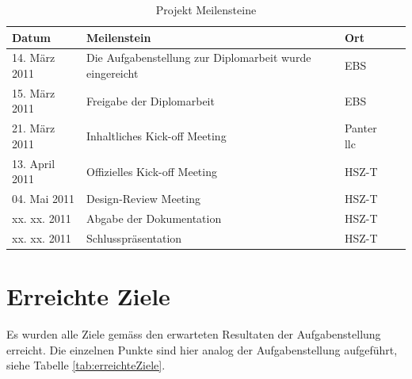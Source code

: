   \begin{table}[ht]
    \begin{center}
      \begin{tabular}{lp{7cm}ll}
        \toprule
        Datum & Meilenstein & Ort \\
        \midrule
        14. März 2011 &
        Die Aufgabenstellung zur Diplomarbeit wurde eingereicht &
        \ac{EBS}\\
        15. März 2011 &
        Freigabe der Diplomarbeit &
        \ac{EBS}\\
        21. März 2011 &
        Inhaltliches Kick-off Meeting &
        Panter llc\\
        13. April 2011 &
        Offizielles Kick-off Meeting &
        \ac{HSZ-T}\\
        04. Mai 2011 &
        Design-Review Meeting &
        \ac{HSZ-T}\\
        xx. xx. 2011 &
        Abgabe der Dokumentation &
        \ac{HSZ-T}\\
        xx. xx. 2011 &
        Schlusspräsentation &
        \ac{HSZ-T}\\
        \bottomrule
      \end{tabular}
      \caption{Projekt Meilensteine}
      \label{tab:milestones}
    \end{center}
  \end{table}
  
  \newpage
  
  \section{Erreichte Ziele}
  
  Es wurden alle Ziele gemäss den erwarteten Resultaten der Aufgabenstellung
  erreicht. Die einzelnen Punkte sind hier analog der Aufgabenstellung
  aufgeführt, siehe Tabelle \ref{tab:erreichteZiele}.
  \newline
  
